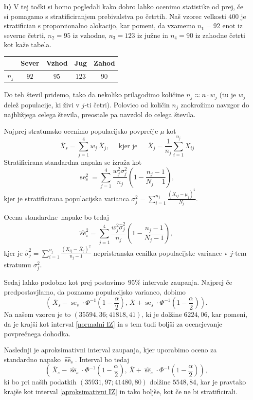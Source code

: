 \documentclass[a4paper,11pt]{article}
\newcommand{\olsi}[1]{\,\overline{\!{#1}}} %
\newcommand{\inv}{^{-1}}
\DeclareMathOperator{\se}{se}
\begin{document}
\noindent
\textbf{b)} V tej točki si bomo pogledali kako dobro lahko ocenimo statistike od prej, če si pomagamo s stratificiranjem prebivalstva po četrtih. Naš vzorec velkosti $400$ je stratifician s proporcionalno alokacijo, kar pomeni, da vzamemo $n_1 = 92$ enot iz severne četrti, $n_2 = 95$ iz vzhodne, $n_3 = 123$ iz južne in $n_4 = 90$ iz zahodne četrti kot kaže tabela.
\begin{center}
\begin{tabular}{|c || c c c c ||}
    \hline
    & Sever & Vzhod & Jug & Zahod \\
    \hline
    $n_j$ & $92$ & $95$ & $123$ & $90$ \\
    \hline 
\end{tabular}
\end{center}
Do teh števil pridemo, tako da nekoliko prilagodimo količine $n_j \approx n \cdot w_j$ (tu je $w_j$ delež populacije, ki živi v $j$-ti četri). Polovico od količin $n_j$ zaokrožimo navzgor do najbližjega celega števila, preostale pa navzdol do celega števila.

Najprej stratumsko ocenimo populacijsko povprečje $\mu$ kot
\[
    \olsi{X}_s = \sum_{j = 1}^4 w_j \olsi{X}_j, \quad \text{ kjer je } \quad \olsi{X}_j = \frac{1}{n_j}\sum_{i = 1}^{n_j} X_{ij}
\]
Stratificirana standardna napaka se izraža kot
\[
    \se^2_s = \sum_{j = 1}^4 \frac{w_j^2 \sigma_j^2}{n_j}\left(1 - \frac{n_j - 1}{N_j - 1}\right), 
\]
kjer je stratificirana populacijska varianca $\sigma_j^2 = \sum_{i = 1}^{n_j} \frac{(X_{ij} - \mu_j)^2}{N_j}$. 

Ocena standardne napake bo tedaj 
\[
    \hat{se}^2_s = \sum_{j = 1}^4 \frac{w_j^2 \hat{\sigma}_j^2}{n_j}\left(1 - \frac{n_j - 1}{N_j - 1}\right),
\] 
kjer je $\hat{\sigma}^2_j = \sum_{i = 1}^{n_j} \frac{(X_{ij} - \olsi{X}_j)^2}{n_j - 1}$ nepristranska cenilka populacijske variance v $j$-tem stratumu $\sigma_j^2$.

Sedaj lahko podobno kot prej postavimo $95\%$ intervale zaupanja. Najprej če predpostavjlamo, da poznamo populacijsko varianco, dobimo
\[
    \left(\olsi{X}_s - \se_s \cdot \Phi\inv\left(1 - \frac{\alpha}{2}\right), 
    \olsi{X} + \se_s \cdot \Phi\inv\left(1 - \frac{\alpha}{2}\right)\right).
\] 
Na našem vzorcu je to $\left(35594,36; 41818,41 \right)$, ki je dolžine $6224,06$, kar pomeni, da je krajši kot interval \eqref{normalni IZ} in s tem tudi boljši za ocenejevanje povprečnega dohodka. 

Naslednji je aproksimativni interval zaupanja, kjer uporabimo oceno za standardno napako $\hat{\se}_s$. Interval bo tedaj 
\[
    \left(\olsi{X}_s - \hat{\se}_s \cdot \Phi\inv\left(1 - \frac{\alpha}{2}\right), 
    \olsi{X} + \hat{\se}_s \cdot \Phi\inv\left(1 - \frac{\alpha}{2}\right)\right), 
\]
ki bo pri naših podatkih $\left(35931,97; 41480,80\right)$ dolžine $5548,84$, kar je pravtako krajše kot interval \eqref{aproksimativni IZ} in tako boljše, kot če ne bi stratificirali.
\end{document}
